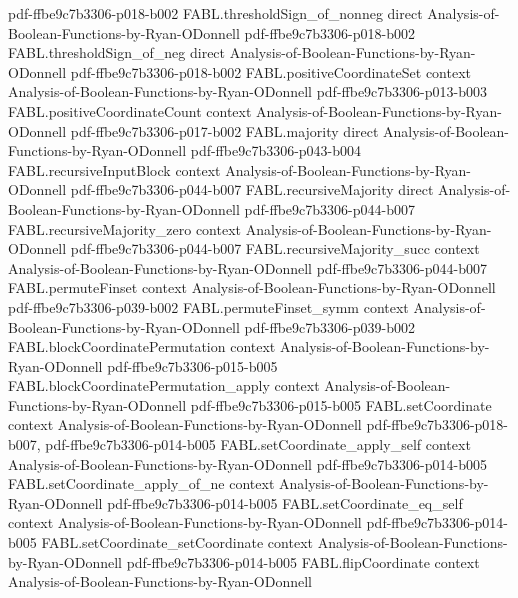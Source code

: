 \begin{theorem}
  {pdf-ffbe9c7b3306-p018-b002}
\proofstep
  {FABL.thresholdSign_of_nonneg}
  {direct}
  {Analysis-of-Boolean-Functions-by-Ryan-ODonnell}
  {pdf-ffbe9c7b3306-p018-b002}
\proofstep
  {FABL.thresholdSign_of_neg}
  {direct}
  {Analysis-of-Boolean-Functions-by-Ryan-ODonnell}
  {pdf-ffbe9c7b3306-p018-b002}
\proofstep
  {FABL.positiveCoordinateSet}
  {context}
  {Analysis-of-Boolean-Functions-by-Ryan-ODonnell}
  {pdf-ffbe9c7b3306-p013-b003}
\proofstep
  {FABL.positiveCoordinateCount}
  {context}
  {Analysis-of-Boolean-Functions-by-Ryan-ODonnell}
  {pdf-ffbe9c7b3306-p017-b002}
\proofstep
  {FABL.majority}
  {direct}
  {Analysis-of-Boolean-Functions-by-Ryan-ODonnell}
  {pdf-ffbe9c7b3306-p043-b004}
\proofstep
  {FABL.recursiveInputBlock}
  {context}
  {Analysis-of-Boolean-Functions-by-Ryan-ODonnell}
  {pdf-ffbe9c7b3306-p044-b007}
\proofstep
  {FABL.recursiveMajority}
  {direct}
  {Analysis-of-Boolean-Functions-by-Ryan-ODonnell}
  {pdf-ffbe9c7b3306-p044-b007}
\proofstep
  {FABL.recursiveMajority_zero}
  {context}
  {Analysis-of-Boolean-Functions-by-Ryan-ODonnell}
  {pdf-ffbe9c7b3306-p044-b007}
\proofstep
  {FABL.recursiveMajority_succ}
  {context}
  {Analysis-of-Boolean-Functions-by-Ryan-ODonnell}
  {pdf-ffbe9c7b3306-p044-b007}
\proofstep
  {FABL.permuteFinset}
  {context}
  {Analysis-of-Boolean-Functions-by-Ryan-ODonnell}
  {pdf-ffbe9c7b3306-p039-b002}
\proofstep
  {FABL.permuteFinset_symm}
  {context}
  {Analysis-of-Boolean-Functions-by-Ryan-ODonnell}
  {pdf-ffbe9c7b3306-p039-b002}
\proofstep
  {FABL.blockCoordinatePermutation}
  {context}
  {Analysis-of-Boolean-Functions-by-Ryan-ODonnell}
  {pdf-ffbe9c7b3306-p015-b005}
\proofstep
  {FABL.blockCoordinatePermutation_apply}
  {context}
  {Analysis-of-Boolean-Functions-by-Ryan-ODonnell}
  {pdf-ffbe9c7b3306-p015-b005}
\proofstep
  {FABL.setCoordinate}
  {context}
  {Analysis-of-Boolean-Functions-by-Ryan-ODonnell}
  {pdf-ffbe9c7b3306-p018-b007,
    pdf-ffbe9c7b3306-p014-b005}
\proofstep
  {FABL.setCoordinate_apply_self}
  {context}
  {Analysis-of-Boolean-Functions-by-Ryan-ODonnell}
  {pdf-ffbe9c7b3306-p014-b005}
\proofstep
  {FABL.setCoordinate_apply_of_ne}
  {context}
  {Analysis-of-Boolean-Functions-by-Ryan-ODonnell}
  {pdf-ffbe9c7b3306-p014-b005}
\proofstep
  {FABL.setCoordinate_eq_self}
  {context}
  {Analysis-of-Boolean-Functions-by-Ryan-ODonnell}
  {pdf-ffbe9c7b3306-p014-b005}
\proofstep
  {FABL.setCoordinate_setCoordinate}
  {context}
  {Analysis-of-Boolean-Functions-by-Ryan-ODonnell}
  {pdf-ffbe9c7b3306-p014-b005}
\proofstep
  {FABL.flipCoordinate}
  {context}
  {Analysis-of-Boolean-Functions-by-Ryan-ODonnell}

\end{theorem}
